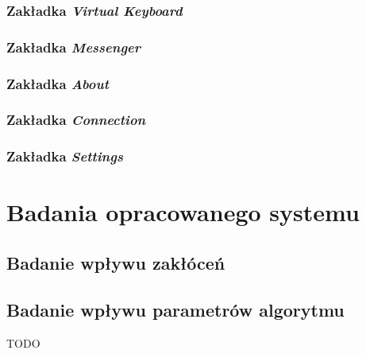 \documentclass[skorowidz,skroty]{dyplomWEZUT}
\begin{document}
\subsection{Zakładka \textit{Virtual Keyboard}}
\subsection{Zakładka \textit{Messenger}}
\subsection{Zakładka \textit{About}}
\subsection{Zakładka \textit{Connection}}
\subsection{Zakładka \textit{Settings}}

\chapter{Badania opracowanego systemu}
\section{Badanie wpływu zakłóceń}
\section{Badanie wpływu parametrów algorytmu}



\begin{zakonczenie}\label{chap:zakonczenie}
TODO
\end{zakonczenie}

\printbibliography[heading=bibintoc]

\listoftables

\listoffigures

\listoflistings


\printindex
\end{document}
